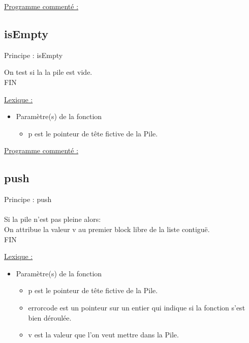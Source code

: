 \documentclass[a4paper]{article}
\newcommand\tab[1][1cm]{\hspace*{#1}}
\begin{document}
\underline{Programme commenté :}

\newpage
\subsection{isEmpty}

\begin{algorithm}

Principe : isEmpty

\tab On test si la la pile est vide. 
\\



FIN
\end{algorithm}


\underline{Lexique :}

\begin{itemize}

\item Paramètre(s) de la fonction  

\begin{itemize}

\item p est le pointeur de tête fictive de la Pile.

\end{itemize}

\end{itemize}

\underline{Programme commenté :}
\subsection{push}

\begin{algorithm}

Principe : push
\\
\\
\tab Si la pile n'est pas pleine alors:
\\
\tab \tab On attribue la valeur v au premier block libre de la liste contiguë.
\\



FIN

\end{algorithm}


\underline{Lexique :}

\begin{itemize}

\item Paramètre(s) de la fonction  

\begin{itemize}

\item p est le pointeur de tête fictive de la Pile.

\item errorcode est un pointeur sur un entier qui indique si la fonction s'est bien déroulée.

\item v est la valeur que l'on veut mettre dans la Pile.

\end{itemize}


\end{itemize}
\end{document}
